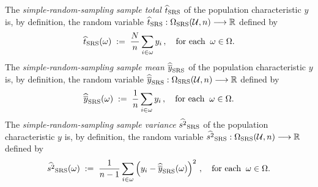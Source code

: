 \documentclass{article}
\begin{document}
\begin{definition}\quad
The \emph{simple-random-sampling sample total} $\widehat{t}_{\textnormal{SRS}}$ of the population characteristic $y$ is, by definition, the random variable $\widehat{t}_{\textnormal{SRS}} : \Omega_{\textnormal{SRS}}(\mathcal{U},n) \longrightarrow \Re$ defined by 
\begin{equation*}
    \widehat{t}_{\textnormal{SRS}}(\omega) \; := \; \dfrac{N}{n}\sum_{i\in\omega}y_{i}\,, \quad\textnormal{for each}\;\; \omega\in\Omega.
\end{equation*}
The \emph{simple-random-sampling sample mean} $\widehat{\overline{y}}_{\textnormal{SRS}}$ of the population characteristic $y$ is, by definition, the random variable $\widehat{\overline{y}}_{\textnormal{SRS}} : \Omega_{\textnormal{SRS}}(\mathcal{U},n) \longrightarrow \Re$ defined by
\begin{equation*}
    \widehat{\overline{y}}_{\textnormal{SRS}}(\omega) \; := \; \dfrac{1}{n}\sum_{i\in\omega} y_{i}\,, \quad\textnormal{for each}\;\; \omega\in\Omega.
\end{equation*}
The \emph{simple-random-sampling sample variance} $\widehat{s^{2}}_{\textnormal{SRS}}$ of the population characteristic $y$ is, by definition, the random variable $\widehat{s^{2}}_{\textnormal{SRS}} : \Omega_{\textnormal{SRS}}(\mathcal{U},n) \longrightarrow \Re$ defined by
\begin{equation*}
    \widehat{s^{2}}_{\textnormal{SRS}}(\omega) \; := \; \dfrac{1}{n-1}\sum_{i\in\omega} \left(y_{i}-\widehat{\overline{y}}_{\textnormal{SRS}}(\omega)\right)^{2}\,, \quad\textnormal{for each}\;\; \omega\in\Omega.
\end{equation*}
\end{definition}
\end{document}
